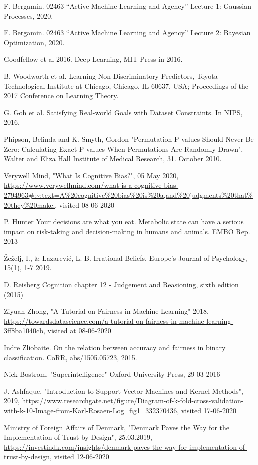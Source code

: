 \documentclass[11pt, fleqn, titlepage]{article}
\begin{document}
\begin{thebibliography}{9}
		 F. Bergamin. 02463 “Active Machine Learning and Agency” Lecture 1: Gaussian Processes, 2020.
		
		 F. Bergamin. 02463 “Active Machine Learning and Agency” Lecture 2: Bayesian Optimization, 2020.
		
		 Goodfellow-et-al-2016. Deep Learning, MIT Press in 2016. 
		
		 B. Woodworth et al. Learning Non-Discriminatory Predictors, Toyota Technological Institute at Chicago, Chicago, IL 60637, USA; Proceedings of the 2017 Conference on Learning Theory.
		
		 G. Goh et al. Satisfying Real-world Goals with Dataset Constraints. In NIPS, 2016.
		
		 Phipson, Belinda and K. Smyth, Gordon "Permutation P-values Should Never Be Zero: Calculating Exact P-values When Permutations Are Randomly Drawn", Walter and Eliza Hall Institute of Medical Research, 31. October 2010.
		
		 Verywell Mind, "What Is Cognitive Bias?", 05 May 2020,
		\url{https://www.verywellmind.com/what-is-a-cognitive-bias-2794963#:~:text=A%20cognitive%20bias%20is%20a,and%20judgments%20that%20they%20make.}, visited 08-06-2020
		
		 P. Hunter Your decisions are what you eat. Metabolic state can have a serious impact on risk-taking and decision-making in humans and animals. EMBO Rep. 2013
		
		 Žeželj, I., \& Lazarević, L. B.  Irrational Beliefs. Europe’s Journal of Psychology, 15(1), 1-7 2019.
		
		 D. Reisberg Cognition chapter 12 - Judgement and Reasioning, sixth edition (2015)
		
		 Ziyuan Zhong, "A Tutorial on Fairness in Machine Learning" 2018, \url{https://towardsdatascience.com/a-tutorial-on-fairness-in-machine-learning-3ff8ba1040cb}, visited at 08-06-2020
		
		 Indre Zliobaite. On the relation between accuracy and fairness in binary classification. CoRR, abs/1505.05723, 2015.
		
		 Nick Bostrom, "Superintelligence" Oxford University Press, 29-03-2016
		
		 J. Ashfaque, "Introduction to Support Vector Machines and Kernel Methods", 2019, \url{https://www.researchgate.net/figure/Diagram-of-k-fold-cross-validation-with-k-10-Image-from-Karl-Rosaen-Log_fig1_332370436}, visited 17-06-2020
		
		 Ministry of Foreign Affairs of Denmark, "Denmark Paves the Way for the Implementation of Trust by Design", 25.03.2019, \url{https://investindk.com/insights/denmark-paves-the-way-for-implementation-of-trust-by-design}, visited 12-06-2020
		
	\end{thebibliography}
	
	
	\newpage
	
	
\end{document}
